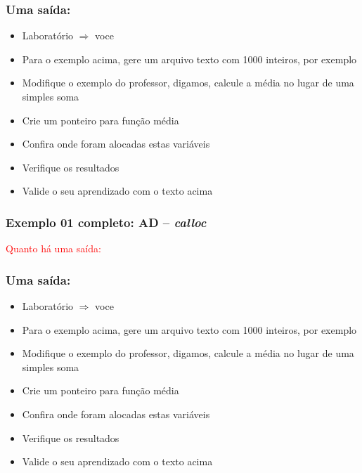 \begin{frame}[fragile, c]

\frametitle{Uma saída:}
\begin{block}{}
\begin{itemize}
  \item Laboratório $\Rightarrow $ voce
  \item Para o exemplo acima, gere um arquivo texto com 1000 inteiros, por exemplo
  \item Modifique o exemplo do professor, digamos, calcule
  a média no lugar de uma simples soma
  \item Crie um ponteiro para  função média 
    \item Confira onde foram alocadas estas variáveis
  \item Verifique os resultados
  \item Valide o seu aprendizado com o texto acima 

\end{itemize}
\end{block}
\end{frame}


\begin{frame}[allowframebreaks=0.9, c]

\frametitle{Exemplo 01 completo: AD -- \textit{calloc}}


\pause
\textcolor{red}{Quanto há uma saída:}
\end{frame}

\begin{frame}[fragile, c]

\frametitle{Uma saída:}
\begin{block}{}
\begin{itemize}
  \item Laboratório $\Rightarrow $ voce
  \item Para o exemplo acima, gere um arquivo texto com 1000 inteiros, por exemplo
  \item Modifique o exemplo do professor, digamos, calcule
  a média no lugar de uma simples soma
  \item Crie um ponteiro para  função média 
    \item Confira onde foram alocadas estas variáveis
  \item Verifique os resultados
  \item Valide o seu aprendizado com o texto acima 

\end{itemize}
\end{block}
\end{frame}


